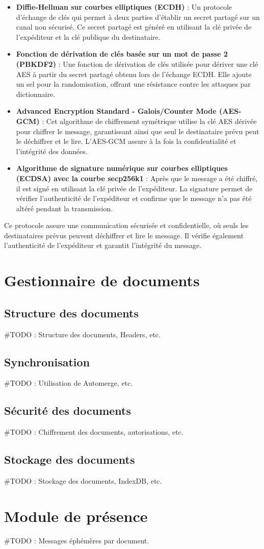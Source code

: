 \begin{itemize}
\item \textbf{Diffie-Hellman sur courbes elliptiques (ECDH)} : Un protocole d'échange de clés qui permet à deux parties d'établir un secret partagé sur un canal non sécurisé. Ce secret partagé est généré en utilisant la clé privée de l'expéditeur et la clé publique du destinataire.
\item \textbf{Fonction de dérivation de clés basée sur un mot de passe 2 (PBKDF2)} : Une fonction de dérivation de clés utilisée pour dériver une clé AES à partir du secret partagé obtenu lors de l'échange ECDH. Elle ajoute un sel pour la randomisation, offrant une résistance contre les attaques par dictionnaire.
\item \textbf{Advanced Encryption Standard - Galois/Counter Mode (AES-GCM)} : Cet algorithme de chiffrement symétrique utilise la clé AES dérivée pour chiffrer le message, garantissant ainsi que seul le destinataire prévu peut le déchiffrer et le lire. L'AES-GCM assure à la fois la confidentialité et l'intégrité des données.
\item \textbf{Algorithme de signature numérique sur courbes elliptiques (ECDSA) avec la courbe secp256k1} : Après que le message a été chiffré, il est signé en utilisant la clé privée de l'expéditeur. La signature permet de vérifier l'authenticité de l'expéditeur et confirme que le message n'a pas été altéré pendant la transmission.
\end{itemize}

Ce protocole assure une communication sécurisée et confidentielle, où seuls les destinataires prévus peuvent déchiffrer et lire le message. Il vérifie également l'authenticité de l'expéditeur et garantit l'intégrité du message.


\section{Gestionnaire de documents}
\subsection{Structure des documents}
#TODO : Structure des documents, Headers, etc.
\subsection{Synchronisation}
#TODO : Utilisation de Automerge, etc.
\subsection{Sécurité des documents}
#TODO : Chiffrement des documents, autorisations, etc.
\subsection{Stockage des documents}
#TODO : Stockage des documents, IndexDB, etc.

\section{Module de présence}
#TODO : Messages éphémères par document.
